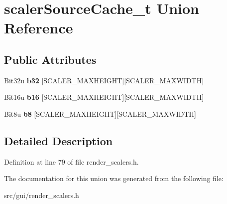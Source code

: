 \hypertarget{unionscalerSourceCache__t}{\section{scaler\-Source\-Cache\-\_\-t Union Reference}
\label{unionscalerSourceCache__t}
}
\subsection*{Public Attributes}
\begin{DoxyCompactItemize}
\item 
\hypertarget{unionscalerSourceCache__t_afd49a820312dea0cf5e2e5ab05994154}{Bit32u {\bfseries b32} \mbox{[}S\-C\-A\-L\-E\-R\-\_\-\-M\-A\-X\-H\-E\-I\-G\-H\-T\mbox{]}\mbox{[}S\-C\-A\-L\-E\-R\-\_\-\-M\-A\-X\-W\-I\-D\-T\-H\mbox{]}}\label{unionscalerSourceCache__t_afd49a820312dea0cf5e2e5ab05994154}

\item 
\hypertarget{unionscalerSourceCache__t_a53d012723435059dfaff1354d7e15dd5}{Bit16u {\bfseries b16} \mbox{[}S\-C\-A\-L\-E\-R\-\_\-\-M\-A\-X\-H\-E\-I\-G\-H\-T\mbox{]}\mbox{[}S\-C\-A\-L\-E\-R\-\_\-\-M\-A\-X\-W\-I\-D\-T\-H\mbox{]}}\label{unionscalerSourceCache__t_a53d012723435059dfaff1354d7e15dd5}

\item 
\hypertarget{unionscalerSourceCache__t_a4d913980d175a8c341b7bc957a9e2938}{Bit8u {\bfseries b8} \mbox{[}S\-C\-A\-L\-E\-R\-\_\-\-M\-A\-X\-H\-E\-I\-G\-H\-T\mbox{]}\mbox{[}S\-C\-A\-L\-E\-R\-\_\-\-M\-A\-X\-W\-I\-D\-T\-H\mbox{]}}\label{unionscalerSourceCache__t_a4d913980d175a8c341b7bc957a9e2938}

\end{DoxyCompactItemize}


\subsection{Detailed Description}


Definition at line 79 of file render\-\_\-scalers.\-h.



The documentation for this union was generated from the following file\-:\begin{DoxyCompactItemize}
\item 
src/gui/render\-\_\-scalers.\-h\end{DoxyCompactItemize}
